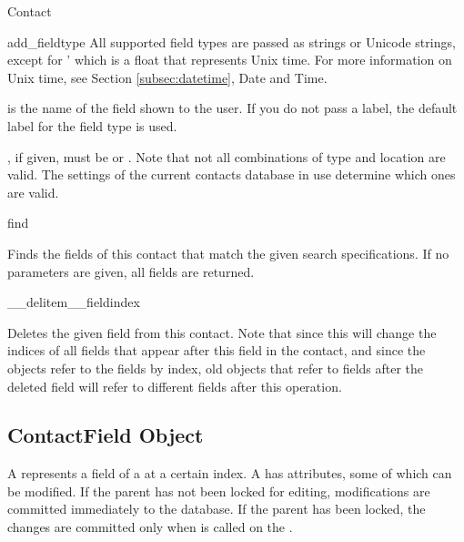 \begin{classdesc*}{Contact}
\begin{methoddesc}[Contact]{add_field}{type }
All supported field types are passed as strings or Unicode strings, except for 
' which is a float that represents Unix time. For more information 
on Unix time, see Section \ref{subsec:datetime}, Date and Time.

 is the name of the field shown to the user. If you 
do not pass a label, the default label for the field type is used.

, if given, must be  or 
. Note that not all combinations of type and location are 
valid. The settings of the current contacts database in use determine which 
ones are valid. 

\end{methoddesc}

\begin{methoddesc}[Contact]{find}{}

Finds the fields of this contact that match the given search specifications. 
If no parameters are given, all fields are returned.

\end{methoddesc}

\begin{methoddesc}[Contact]{__delitem__}{fieldindex}

Deletes the given field from this contact. Note that since this will change 
the indices of all fields that appear after this field in the contact, and 
since the  objects refer to the fields by index, old 
objects that refer to fields after the deleted field 
will refer to different fields after this operation.

\end{methoddesc}

\end{classdesc*}

\subsection{ContactField Object}
\label{subsec:contactfield}

A  represents a field of a  at a 
certain index. A  has attributes, some of which can be 
modified. If the parent  has not been locked for editing, 
modifications are committed immediately to the database. If the parent 
 has been locked, the changes are committed only when 
 is called on the .

